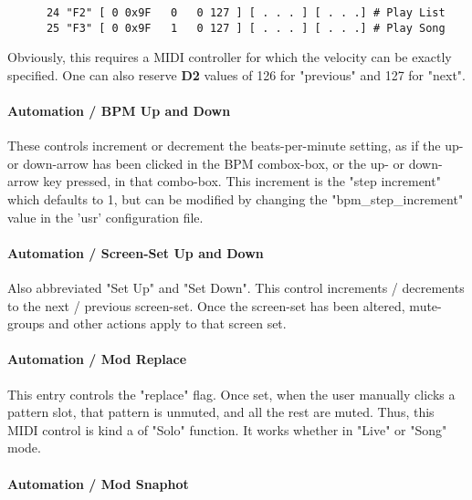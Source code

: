    \begin{verbatim}
      24 "F2" [ 0 0x9F   0   0 127 ] [ . . . ] [ . . .] # Play List
      25 "F3" [ 0 0x9F   1   0 127 ] [ . . . ] [ . . .] # Play Song
   \end{verbatim}

   Obviously, this requires a MIDI controller for which the velocity can be
   exactly specified.  One can also reserve \textbf{D2} values of 126 for
   "previous" and 127 for "next".

\paragraph{Automation / BPM Up and Down}
\label{paragraph:configuration_midi_ctrl_bpmupdn}

   These controls increment or decrement the beats-per-minute setting, as if
   the up- or down-arrow has been clicked in the BPM combox-box, or the up- or
   down-arrow key pressed, in that combo-box.
   This increment is the
   "step increment" which defaults to 1, but can be modified by
   changing the "bpm\_step\_increment" value in the 'usr'
   configuration file.

\paragraph{Automation / Screen-Set Up and Down}
\label{paragraph:configuration_midi_ctrl_ssupdn}

   Also abbreviated "Set Up" and "Set Down".
   This control increments / decrements to the next / previous screen-set. 
   Once the screen-set has been altered, mute-groups and other
   actions apply to that screen set.

\paragraph{Automation / Mod Replace}
\label{paragraph:configuration_midi_ctrl_modrep}

   This entry controls the "replace" flag.
   Once set, when the user manually clicks a pattern slot,
   that pattern is unmuted, and all the rest are muted.
   Thus, this MIDI control is kind a of "Solo" function.
   It works whether in "Live" or "Song" mode.

\paragraph{Automation / Mod Snaphot}
\label{paragraph:configuration_midi_ctrl_modsnap}

